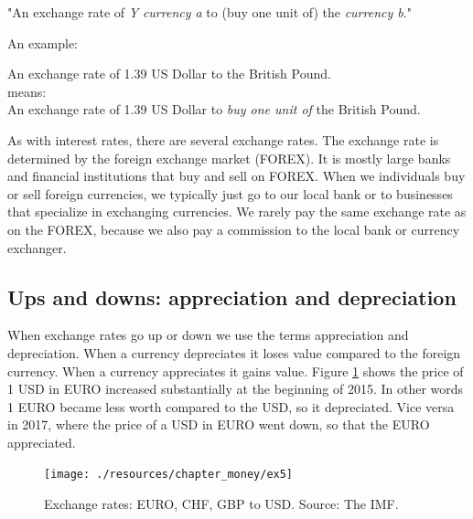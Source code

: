 \documentclass[
]{book}
\begin{document}
\begin{center}
    "An exchange rate of \emph{Y} \emph{currency a} to (buy one unit of) the \emph{currency b}."
\end{center}

An example:

\begin{center}
    An exchange rate of 1.39 US Dollar to  the British Pound.\vspace{12pt}\\
    means:\vspace{12pt}\\
    An exchange rate of 1.39 US Dollar to \emph{buy one unit of} the British Pound.\\
\end{center}

As with interest rates, there are several exchange rates. The exchange rate is determined by the foreign exchange market (FOREX). It is mostly large banks and financial institutions that buy and sell on FOREX. When we individuals buy or sell foreign currencies, we typically just go to our local bank or to businesses that specialize in exchanging currencies. We rarely pay the same exchange rate as on the FOREX, because we also pay a commission to the local bank or currency exchanger.

\hypertarget{ups-and-downs-appreciation-and-depreciation}{%
\subsection*{Ups and downs: appreciation and depreciation}\label{ups-and-downs-appreciation-and-depreciation}}

When exchange rates go up or down we use the terms appreciation and depreciation. When a currency depreciates it loses value compared to the foreign currency. When a currency appreciates it gains value. Figure \ref{fig:money4} shows the price of 1 USD in EURO increased substantially at the beginning of 2015. In other words 1 EURO became less worth compared to the USD, so it depreciated. Vice versa in 2017, where the price of a USD in EURO went down, so that the EURO appreciated.

\begin{figure}

{\centering \texttt{[image: ./resources/chapter\_money/ex5]} 

}

\caption{Exchange rates: EURO, CHF, GBP to USD. Source: The IMF.}\label{fig:money4}
\end{figure}
\end{document}
